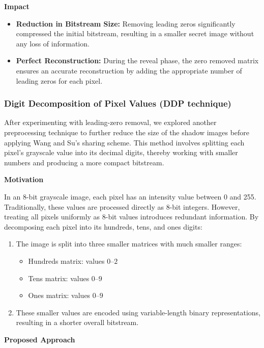 \textbf{Impact}
\begin{itemize}
    \item \textbf{Reduction in Bitstream Size:} Removing leading zeros significantly compressed the initial bitstream, resulting in a smaller secret image without any loss of information.
    \item \textbf{Perfect Reconstruction:} During the reveal phase, the zero removed matrix ensures an accurate reconstruction by adding the appropriate number of leading zeros for each pixel.
\end{itemize}
 
\subsubsection{Digit Decomposition of Pixel Values (DDP technique)}
 
After experimenting with leading-zero removal, we explored another preprocessing technique to further reduce the size of the shadow images before applying Wang and Su's sharing scheme. This method involves splitting each pixel's grayscale value into its decimal digits, thereby working with smaller numbers and producing a more compact bitstream.
 
\textbf{Motivation}
 
In an 8-bit grayscale image, each pixel has an intensity value between 0 and 255. Traditionally, these values are processed directly as 8-bit integers. However, treating all pixels uniformly as 8-bit values introduces redundant information. By decomposing each pixel into its hundreds, tens, and ones digits:
\begin{enumerate}
    \item The image is split into three smaller matrices with much smaller ranges:
    \begin{itemize}
        \item Hundreds matrix: values $0$--$2$
        \item Tens matrix: values $0$--$9$
        \item Ones matrix: values $0$--$9$
    \end{itemize}
    \item These smaller values are encoded using variable-length binary representations, resulting in a shorter overall bitstream.
\end{enumerate}
 
\textbf{Proposed Approach}
 
